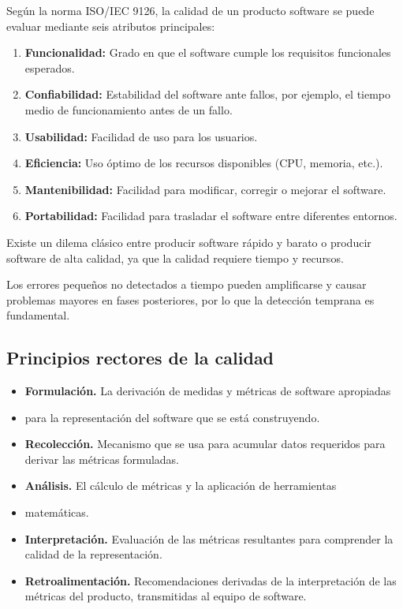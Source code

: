 \begin{definicion}
    Según la norma ISO/IEC 9126, la calidad de un producto software se puede evaluar mediante seis atributos principales:
\end{definicion}

\begin{enumerate}
    \item \textbf{Funcionalidad:} Grado en que el software cumple los requisitos funcionales esperados.
    \item \textbf{Confiabilidad:} Estabilidad del software ante fallos, por ejemplo, el tiempo medio de funcionamiento antes de un fallo.
    \item \textbf{Usabilidad:} Facilidad de uso para los usuarios.
    \item \textbf{Eficiencia:} Uso óptimo de los recursos disponibles (CPU, memoria, etc.).
    \item \textbf{Mantenibilidad:} Facilidad para modificar, corregir o mejorar el software.
    \item \textbf{Portabilidad:} Facilidad para trasladar el software entre diferentes entornos.
\end{enumerate}

\begin{nota}
    Existe un dilema clásico entre producir software rápido y barato o producir software de alta calidad, ya que la calidad requiere tiempo y recursos.
\end{nota}

\begin{nota}
    Los errores pequeños no detectados a tiempo pueden amplificarse y causar problemas mayores en fases posteriores, por lo que la detección temprana es fundamental.
\end{nota}

\subsection{Principios rectores de la calidad}\label{subsec:principios-rectores-de-la-calidad}
\begin{itemize}
    \item \textbf{Formulación.} La derivación de medidas y métricas de software apropiadas
    \item para la representación del software que se está construyendo.
    \item \textbf{Recolección. }Mecanismo que se usa para acumular datos requeridos para derivar las métricas formuladas.
    \item \textbf{Análisis.} El cálculo de métricas y la aplicación de herramientas
    \item matemáticas.
    \item \textbf{Interpretación.} Evaluación de las métricas resultantes para comprender la calidad de la representación.
    \item \textbf{Retroalimentación.} Recomendaciones derivadas de la interpretación de las métricas del producto, transmitidas al equipo de software.
\end{itemize}

